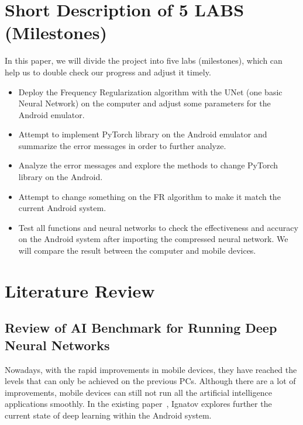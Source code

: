 \documentclass{article}
\begin{document}
\section{Short Description of 5 LABS (Milestones)}

In this paper, we will divide the project into five labs (milestones), which can help us to double check our progress and adjust it timely.

\begin{itemize}
	\item Deploy the Frequency Regularization algorithm with the UNet (one basic Neural Network) on the computer and adjust some parameters for the Android emulator. 
	
	\item Attempt to implement PyTorch library on the Android emulator and summarize the error messages in order to further analyze.
	
	\item Analyze the error messages and explore the methods to change PyTorch library on the Android.
	
	\item Attempt to change something on the FR algorithm to make it match the current Android system. 
	
	\item Test all functions and neural networks to check the effectiveness and accuracy on the Android system after importing the compressed neural network. We will compare the result between the computer and mobile devices. 
	
\end{itemize}

\pagebreak

\section{Literature Review}

\subsection{Review of AI Benchmark for Running Deep Neural Networks}
Nowadays, with the rapid improvements in mobile devices, they have reached the levels that can only be achieved on the previous PCs. Although there are a lot of improvements, mobile devices can still not run all the artificial intelligence applications smoothly. In the existing paper~\cite{Andrey2019Aibenchmark}, Ignatov explores further the current state of deep learning within the Android system.
\end{document}
